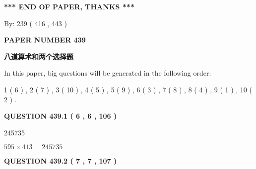 \documentclass{ctexart}
\begin{document}
   
 \vspace{0.2in}
 
   
   
   
   
\vspace{1.0in} 
{\textbf{\large{ *** END OF PAPER, THANKS *** }}} 
   
   
\hspace{1.0in} By: 
 239 ( 416 ,  443 )
   
   
   
   
\newpage 
\setcounter{page}{ 
   439001 } 
   
   
   
   
 {\textbf{ \Large{ PAPER NUMBER  439  }}}
   
   
\vspace{0.2in}
   
   
   
   
   
   
 \vspace{0.2in}
{\LARGE {\textbf{ 八道算术和两个选择题}}}
   
   
   
\vspace{0.2in}
   
In this paper, big questions will be generated in the following order: 
   
   
   1 ( 6 )
 ,
   2 ( 7 )
 ,
   3 ( 10 )
 ,
   4 ( 5 )
 ,
   5 ( 9 )
 ,
   6 ( 3 )
 ,
   7 ( 8 )
 ,
   8 ( 4 )
 ,
   9 ( 1 )
 ,
   10 ( 2 )
 .
  
\vspace{0.2in}
  
{\textbf{\Large{QUESTION
439.1 
 ( 6 , 6 , 106 )
}}}
  
  
 
 
\noindent{}

245735
 
 
 
 
\noindent{}

$ %
595 \times  %
413=   %
245735$
 
 
  
\vspace{0.2in}
  
{\textbf{\Large{QUESTION
439.2 
 ( 7 , 7 , 107 )
}}}
  
\end{document}
